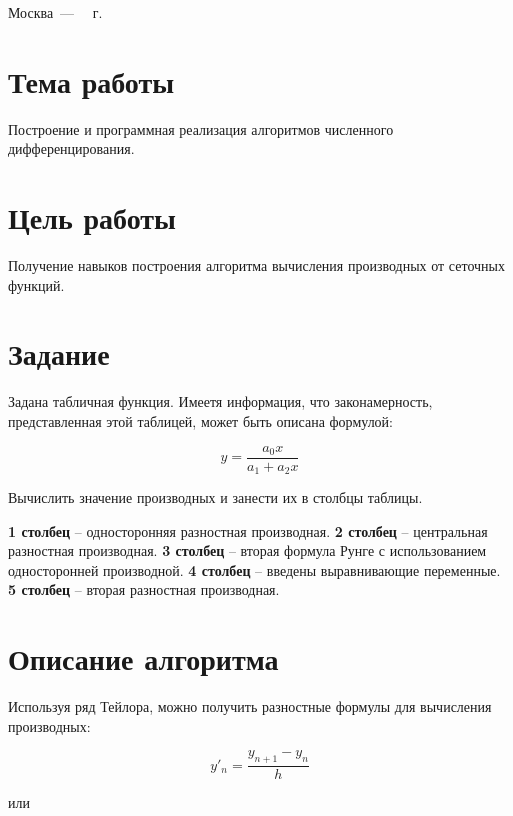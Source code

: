 \documentclass[a4paper,12pt]{article}
\begin{document}
\begin{center}
	\vfill
	Москва~---~\the\year
~г.
\end{center}
\clearpage
\section{Тема работы}

\noindent Построение и программная реализация алгоритмов численного дифференцирования.
\section{Цель работы}

\noindent Получение навыков построения алгоритма вычисления производных от сеточных функций.
\section{Задание}
\noindent Задана табличная функция. Имеетя информация, что законамерность, представленная этой таблицей, может быть описана формулой:

$$ y = \frac{a_{0}x}{a_{1}+a_{2}x}$$\newline

\noindent Вычислить значение производных и занести их в столбцы таблицы.\newline

\noindent \textbf{1 столбец} -- односторонняя разностная производная. \newline
\textbf{2 столбец} -- центральная разностная производная. \newline
\textbf{3 столбец} -- вторая формула Рунге с использованием односторонней производной. \newline
\textbf{4 столбец} -- введены выравнивающие переменные. \newline
\textbf{5 столбец} -- вторая разностная производная. \newline

\noindent 

\noindent

\section{Описание алгоритма}
	
\noindent Используя ряд Тейлора, можно получить разностные формулы для вычисления производных:

$$ y'_{n} = \frac{y_{n + 1} - y_{n}}{h} $$

\noindent или
\end{document}
